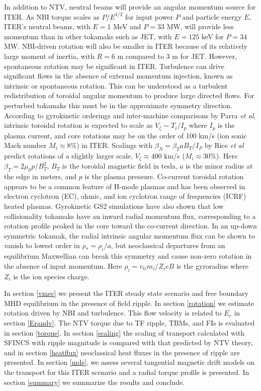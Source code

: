 \documentclass[aip, pop, preprint]{revtex4-1}
\numberwithin{figure}{section}
\numberwithin{equation}{section}
\begin{document}
In addition to NTV, neutral beams will provide an angular momentum source for ITER. As NBI torque scales as $P/E^{1/2}$ for input power $P$ and particle energy $E$, ITER's neutral beams, with $E = 1$ MeV and $P = 33$ MW, will provide less momentum than in other tokamaks such as JET, with $E = 125$ keV for $P = 34$ MW.\cite{Ciric2011} NBI-driven rotation will also be smaller in ITER because of its relatively large moment of inertia, with $R = 6$ m compared to 3 m for JET. However, spontaneous rotation may be significant in ITER. Turbulence can drive significant flows in the absence of external momentum injection, known as intrinsic or spontaneous rotation. This can be understood as a turbulent redistribution of toroidal angular momentum to produce large directed flows. For perturbed tokamaks this must be in the approximate symmetry direction. According to gyrokinetic orderings and inter-machine comparisons by Parra \textit{et al},\cite{Parra2012} intrinsic toroidal rotation is expected to scale as $V_{\zeta} \sim  T_i/I_p$ where $I_p$ is the plasma current, and core rotations may be on the order of 100 km/s (ion sonic Mach number $M_i \approx 8\%$) in ITER. Scalings with $\beta_N = \beta_T a B_T/I_P$ by Rice \textit{et al} \cite{Rice2007} predict rotations of a slightly larger scale, $V_{\zeta} \approx 400$ km/s ($M_i \approx 30\%$). Here $\beta_T =  2\mu_0 p/B_T^2$, $B_T$ is the toroidal magnetic field in tesla, $a$ is the minor radius at the edge in meters, and $p$ is the plasma pressure. Co-current toroidal rotation appears to be a common feature of H-mode plasmas and has been observed in electron cyclotron (EC),\cite{DeGrassie2007} ohmic,\cite{DeGrassie2007} and ion cyclotron range of frequencies (ICRF)\cite{Noterdaeme2003} heated plasmas. Gyrokinetic GS2 simulations have also shown that low collisionality tokamaks have an inward radial momentum flux, corresponding to a rotation profile peaked in the core toward the co-current direction.\cite{Barnes2013} In an up-down symmetric tokamak, the radial intrinsic angular momentum flux can be shown to vanish to lowest order in $\rho_* = \rho_i/a$, but neoclassical departures from an equilibrium Maxwellian can break this symmetry and cause non-zero rotation in the absence of input momentum.\cite{Barnes2013} Here $\rho_i = v_{ti}m_i /{Z_ieB}$ is the gyroradius where $Z_i$ is the ion species charge.

In section \ref{vmec} we present the ITER steady state scenario and free boundary MHD equilibrium in the presence of field ripple. In section \ref{rotation} we estimate rotation driven by NBI and turbulence. This flow velocity is related to $E_r$ in section \ref{Erandv}. The NTV torque due to TF ripple, TBMs, and FIs is evaluated in section \ref{torque}. In section \ref{scaling} the scaling of transport calculated with SFINCS with ripple magnitude is compared with that predicted by NTV theory, and in section \ref{heatflux} neoclassical heat fluxes in the presence of ripple are presented. In section \ref{mds}, we assess several tangential magnetic drift models on the transport for this ITER scenario and a radial torque profile is presented. In section \ref{summary} we summarize the results and conclude.
\end{document}
